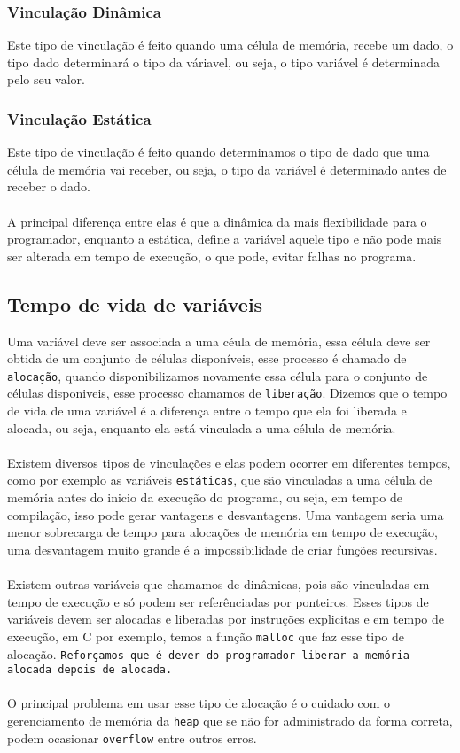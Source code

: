 \documentclass[12pt, onecolumn]{article}
\begin{document}
		\subsubsection{\hspace{1cm}Vinculação Dinâmica}
	Este tipo de vinculação é feito quando uma célula de memória, recebe um dado,
	o tipo dado determinará o tipo da váriavel, ou seja, o tipo variável é 
	determinada pelo seu valor.

		\subsubsection{\hspace{1cm}Vinculação Estática}
	Este tipo de vinculação é feito quando determinamos o tipo de dado que 
	uma célula de memória vai receber, ou seja, o tipo da variável é determinado
	antes de receber o dado.\\
	\\
	A principal diferença entre elas é que a dinâmica da mais flexibilidade 
	para o programador, enquanto a estática, define a variável aquele tipo e 
	não pode mais ser alterada em tempo de execução, o que pode, evitar falhas
	no programa.
	
		\subsection{Tempo de vida de variáveis}
	
	Uma variável deve ser associada a uma céula de memória, essa célula deve
	ser obtida de um conjunto de células disponíveis, esse processo é chamado
	de \texttt{alocação}, quando disponibilizamos novamente essa célula
	para o conjunto de células disponiveis, esse processo chamamos de
	\texttt{liberação}. Dizemos que o tempo de vida de uma variável é 
	a diferença entre o tempo que ela foi liberada e alocada, ou seja, 
	enquanto ela está vinculada a uma célula de memória.\\
	\\
	Existem diversos tipos de vinculações e elas podem ocorrer em diferentes
	tempos, como por exemplo as variáveis \texttt{estáticas}, que são 
	vinculadas a uma célula de memória antes do inicio da execução do programa,
	ou seja, em tempo de compilação, isso pode gerar vantagens e desvantagens.
	Uma vantagem seria uma menor sobrecarga de tempo para alocações de memória
	em tempo de execução, uma desvantagem muito grande é a impossibilidade
	de criar funções recursivas.\\
	\\
	Existem outras variáveis que chamamos de dinâmicas, pois são vinculadas
	em tempo de execução e só podem ser referênciadas por ponteiros. 
	Esses tipos de variáveis devem ser alocadas e liberadas por instruções
	explicitas e em tempo de execução, em C por exemplo, temos a função 
	\texttt{malloc}	que faz esse tipo de alocação. \texttt{Reforçamos que é dever
	do programador liberar a memória alocada depois de alocada.}\\
	\\
	O principal problema em usar esse tipo de alocação é o cuidado com o 
	gerenciamento de memória da \texttt{heap} que se não for administrado
	da forma correta, podem ocasionar \texttt{overflow} entre outros erros.
\end{document}
